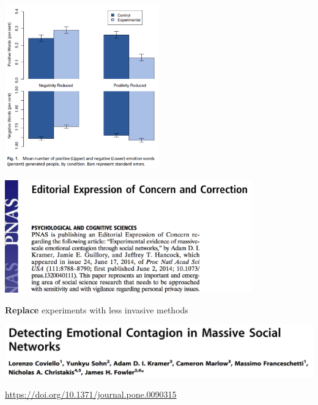 \documentclass[aspectratio=169]{beamer}
\begin{document}
\begin{frame}

\begin{center}
\includegraphics[width=0.5\textwidth]{figures/kramer_experimental_2014_fig1}
\end{center}

\end{frame}
\begin{frame}

\begin{center}
\includegraphics[width=0.8\textwidth]{figures/kramer_experimental_2014_concern}
\end{center}

\end{frame}
\begin{frame}

\begin{framed}
\textbf{Replace} experiments with less invasive methods
\end{framed}

\pause
\begin{center}
\includegraphics[width=\textwidth]{figures/coviello_detecting_2014_title}
\end{center}

\vfill
\tiny{\url{https://doi.org/10.1371/journal.pone.0090315}}

\end{frame}
\end{document}
